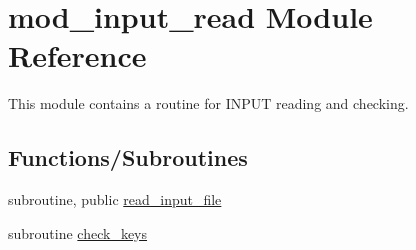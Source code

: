 \hypertarget{namespacemod__input__read}{}\section{mod\+\_\+input\+\_\+read Module Reference}
\label{namespacemod__input__read}


This module contains a routine for I\+N\+P\+UT reading and checking.  


\subsection*{Functions/\+Subroutines}
\begin{DoxyCompactItemize}
\item 
subroutine, public \hyperlink{namespacemod__input__read_ae27abd188ee109221a29ed77b68fb6d9}{read\+\_\+input\+\_\+file}
\item 
subroutine \hyperlink{namespacemod__input__read_a396026faa10ab3698196930dfb90690b}{check\+\_\+keys}
\end{DoxyCompactItemize}
